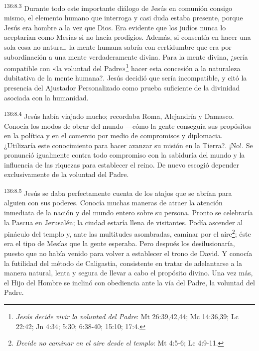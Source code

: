 \par 
\textsuperscript{136:8.3} Durante todo este importante diálogo de Jesús en comunión consigo mismo, el elemento humano que interroga y casi duda estaba presente, porque Jesús era hombre a la vez que Dios. Era evidente que los judíos nunca lo aceptarían como Mesías si no hacía prodigios. Además, si consentía en hacer una sola cosa no natural, la mente humana sabría con certidumbre que era por subordinación a una mente verdaderamente divina. Para la mente divina, ¿sería compatible con «la voluntad del Padre»\footnote{\textit{Jesús decide vivir la voluntad del Padre}: Mt 26:39,42,44; Mc 14:36,39; Lc 22:42; Jn 4:34; 5:30; 6:38-40; 15:10; 17:4.} hacer esta concesión a la naturaleza dubitativa de la mente humana?. Jesús decidió que sería incompatible, y citó la presencia del Ajustador Personalizado como prueba suficiente de la divinidad asociada con la humanidad.

\par 
\textsuperscript{136:8.4} Jesús había viajado mucho; recordaba Roma, Alejandría y Damasco. Conocía los modos de obrar del mundo ---cómo la gente conseguía sus propósitos en la política y en el comercio por medio de compromisos y diplomacia. ¿Utilizaría este conocimiento para hacer avanzar su misión en la Tierra?. ¡No!. Se pronunció igualmente contra todo compromiso con la sabiduría del mundo y la influencia de las riquezas para establecer el reino. De nuevo escogió depender exclusivamente de la voluntad del Padre.

\par 
\textsuperscript{136:8.5} Jesús se daba perfectamente cuenta de los atajos que se abrían para alguien con sus poderes. Conocía muchas maneras de atraer la atención inmediata de la nación y del mundo entero sobre su persona. Pronto se celebraría la Pascua en Jerusalén; la ciudad estaría llena de visitantes. Podía ascender al pináculo del templo y, ante las multitudes asombradas, caminar por el aire\footnote{\textit{Decide no caminar en el aire desde el templo}: Mt 4:5-6; Lc 4:9-11.}; éste era el tipo de Mesías que la gente esperaba. Pero después los desilusionaría, puesto que no había venido para volver a establecer el trono de David. Y conocía la futilidad del método de Caligastia, consistente en tratar de adelantarse a la manera natural, lenta y segura de llevar a cabo el propósito divino. Una vez más, el Hijo del Hombre se inclinó con obediencia ante la vía del Padre, la voluntad del Padre.

